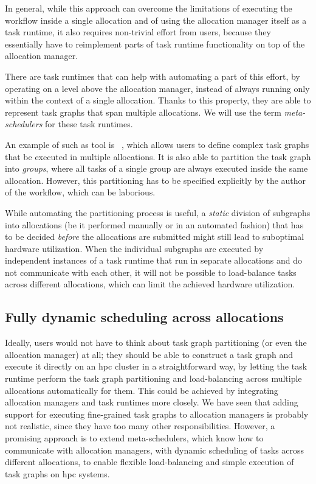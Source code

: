 In general, while this approach can overcome the limitations of executing the workflow inside a
single allocation and of using the allocation manager itself as a task runtime, it also requires
non-trivial effort from users, because they essentially have to reimplement parts of task runtime
functionality on top of the allocation manager.


There are task runtimes that can help with automating a part of this effort, by operating on a
level above the allocation manager, instead of always running only within the context of a single
allocation. Thanks to this property, they are able to represent task graphs that span multiple
allocations. We will use the term \emph{meta-schedulers} for these task runtimes.

An example of such as tool is \snakemake~\cite{snakemake}, which allows users to define
complex task graphs that be executed in multiple allocations. It is also able to partition the task
graph into \emph{groups}, where all tasks of a single group are always executed inside
the same allocation. However, this partitioning has to be specified explicitly by the author of the
workflow, which can be laborious.

While automating the partitioning process is useful, a \emph{static} division of
subgraphs into allocations (be it performed manually or in an automated fashion) that has to be
decided \emph{before} the allocations are submitted might still lead to suboptimal
hardware utilization. When the individual subgraphs are executed by independent instances of a task
runtime that run in separate allocations and do not communicate with each other, it will not be
possible to load-balance tasks across different allocations, which can limit the achieved hardware
utilization.

\subsection*{Fully dynamic scheduling across allocations}
Ideally, users would not have to think about task graph partitioning (or even the allocation
manager) at all; they should be able to construct a task graph and execute it directly on an
\gls{hpc} cluster in a straightforward way, by letting the task runtime perform
the task graph partitioning and load-balancing across multiple allocations automatically for them.
This could be achieved by integrating allocation managers and task runtimes more closely. We have
seen that adding support for executing fine-grained task graphs to allocation managers is probably
not realistic, since they have too many other responsibilities. However, a promising approach is to
extend meta-schedulers, which know how to communicate with allocation managers, with dynamic
scheduling of tasks across different allocations, to enable flexible load-balancing and simple
execution of task graphs on \gls{hpc} systems.

